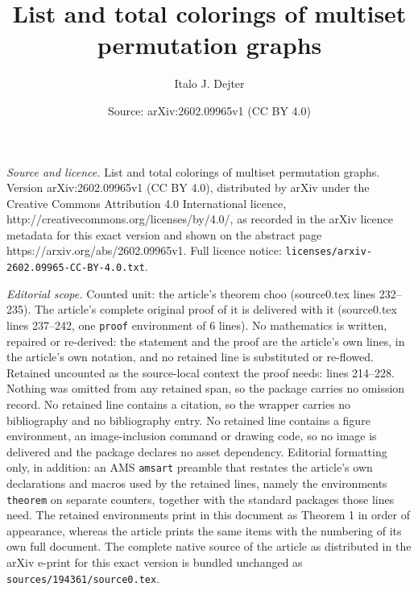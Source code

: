 \documentclass[10pt,a4paper]{amsart}
\title{List and total colorings of multiset permutation graphs}
\author{Italo J. Dejter}
\date{Source: arXiv:2602.09965v1 (CC BY 4.0)}
\begin{document}
\maketitle

\noindent\emph{Source and licence.} List and total colorings of multiset permutation graphs. Version arXiv:2602.09965v1 (CC BY 4.0), distributed by arXiv under the Creative Commons Attribution 4.0 International licence, http://creativecommons.org/licenses/by/4.0/, as recorded in the arXiv licence metadata for this exact version and shown on the abstract page https://arxiv.org/abs/2602.09965v1. Full licence notice: \texttt{licenses/arxiv-2602.09965-CC-BY-4.0.txt}.\par\smallskip

\noindent\textit{Editorial scope.} Counted unit: the article's theorem choo (source0.tex lines 232--235). The article's complete original proof of it is delivered with it (source0.tex lines 237--242, one \texttt{proof} environment of 6 lines). No mathematics is written, repaired or re-derived: the statement and the proof are the article's own lines, in the article's own notation, and no retained line is substituted or re-flowed.  Retained uncounted as the source-local context the proof needs: lines 214--228.  Nothing was omitted from any retained span, so the package carries no omission record.  No retained line contains a citation, so the wrapper carries no bibliography and no bibliography entry.  No retained line contains a figure environment, an image-inclusion command or drawing code, so no image is delivered and the package declares no asset dependency.  Editorial formatting only, in addition: an AMS \texttt{amsart} preamble that restates the article's own declarations and macros used by the retained lines, namely the environments \texttt{theorem} on separate counters, together with the standard packages those lines need.  The retained environments print in this document as Theorem 1 in order of appearance, whereas the article prints the same items with the numbering of its own full document.  The complete native source of the article as distributed in the arXiv e-print for this exact version is bundled unchanged as \texttt{sources/194361/source0.tex}.
\end{document}

